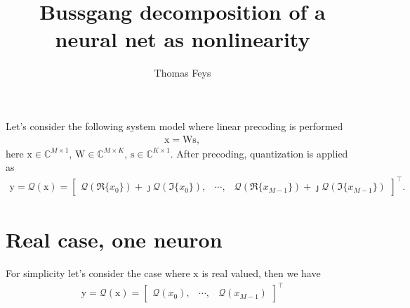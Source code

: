 \documentclass[12pt]{article}
\newcommand{\vect}[1]{\boldsymbol{\mathrm{#1}}}
\newcommand{\mat}[1]{\boldsymbol{\mathrm{#1}}}
\theoremstyle{remark}
\begin{document}
\title{Bussgang decomposition of a neural net as nonlinearity}
\author{Thomas Feys}
\maketitle
\large


Let's consider the following system model where linear precoding is performed
\begin{align}
	\vect{x} = \mat{W}\vect{s},
\end{align}
here $\vect{x} \in \mathbb{C}^{M\times 1}$,  $\mat{W} \in \mathbb{C}^{M\times K}$,  $\vect{s} \in \mathbb{C}^{K\times 1}$.
After precoding, quantization is applied as 
\begin{align}
	\vect{y} = \mathcal{Q}(\vect{x}) = \begin{bmatrix} \mathcal{Q}(\Re\{x_0\}) + \jmath \mathcal{Q}(\Im\{x_0\}), & \cdots,  & \mathcal{Q}(\Re\{x_{M-1}\}) + \jmath \mathcal{Q}(\Im\{x_{M-1}\}) \end{bmatrix}^{\intercal}.
\end{align}

\section{Real case, one neuron}
For simplicity let's consider the case where $\vect{x}$ is real valued, then we have
\begin{align}
	\vect{y} = \mathcal{Q}(\vect{x}) = \begin{bmatrix} \mathcal{Q}(x_0), & \cdots,  & \mathcal{Q}(x_{M-1}) \end{bmatrix}^{\intercal}
\end{align}
\end{document}
